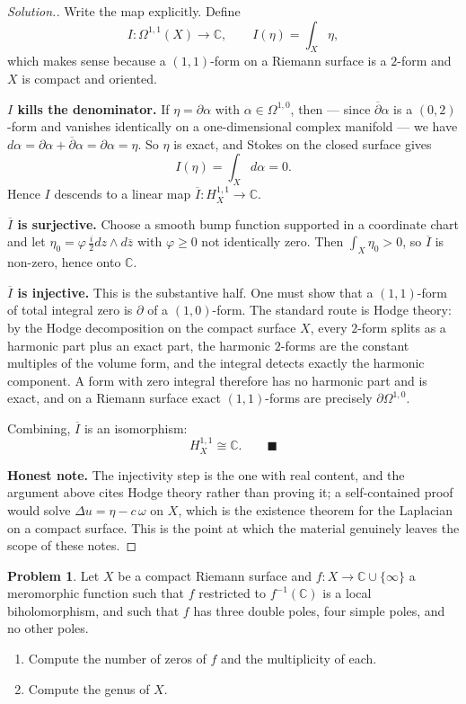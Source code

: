 \documentclass[11pt,a4paper]{article}
\theoremstyle{definition}
\newtheorem{problemx}{Problem}[section]
\newenvironment{problem}{\begin{problemx}}{\end{problemx}}
\newenvironment{solution}
  {\renewcommand{\qedsymbol}{}\begin{proof}[\textit{Solution}.]}
  {\end{proof}}
\begin{document}
\begin{solution}
Write the map explicitly. Define
$$I : \Omega^{1,1}(X) \longrightarrow \mathbb{C},
\qquad I(\eta) = \int_{X}\eta ,$$
which makes sense because a $(1,1)$-form on a Riemann surface is a $2$-form and $X$
is compact and oriented.

\textbf{$I$ kills the denominator.} If $\eta = \partial\alpha$ with
$\alpha \in \Omega^{1,0}$, then --- since $\overline{\partial}\alpha$ is a $(0,2)$-form
and vanishes identically on a one-dimensional complex manifold --- we have
$d\alpha = \partial\alpha + \overline{\partial}\alpha = \partial\alpha = \eta$. So
$\eta$ is exact, and Stokes on the closed surface gives
$$I(\eta) = \int_{X} d\alpha = 0 .$$
Hence $I$ descends to a linear map
$\overline{I} : H^{1,1}_{X} \rightarrow \mathbb{C}$.

\textbf{$\overline{I}$ is surjective.} Choose a smooth bump function supported in a
coordinate chart and let $\eta_0 = \varphi\,\tfrac{i}{2}dz\wedge d\overline{z}$
with $\varphi \geq 0$ not identically zero. Then $\int_X \eta_0 > 0$, so
$\overline{I}$ is non-zero, hence onto $\mathbb{C}$.

\textbf{$\overline{I}$ is injective.} This is the substantive half. One must show
that a $(1,1)$-form of total integral zero is $\partial$ of a $(1,0)$-form. The
standard route is Hodge theory: by the Hodge decomposition on the compact surface
$X$, every $2$-form splits as a harmonic part plus an exact part, the harmonic
$2$-forms are the constant multiples of the volume form, and the integral detects
exactly the harmonic component. A form with zero integral therefore has no harmonic
part and is exact, and on a Riemann surface exact $(1,1)$-forms are precisely
$\partial\Omega^{1,0}$.

Combining, $\overline{I}$ is an isomorphism:
$$\boxed{H^{1,1}_{X} \cong \mathbb{C} .} \qquad \blacksquare$$

\textbf{Honest note.} The injectivity step is the one with real content, and the
argument above cites Hodge theory rather than proving it; a self-contained proof
would solve $\Delta u = \eta - c\,\omega$ on $X$, which is the existence theorem
for the Laplacian on a compact surface. This is the point at which the material
genuinely leaves the scope of these notes.
\end{solution}


\begin{problem}
Let $X$ be a compact Riemann surface and $f : X \rightarrow \mathbb{C}\cup\{\infty\}$
a meromorphic function such that $f$ restricted to $f^{-1}(\mathbb{C})$ is a
local biholomorphism, and such that $f$ has three double poles, four simple
poles, and no other poles.
\begin{enumerate}
\item[(a).] Compute the number of zeros of $f$ and the multiplicity of each.
\item[(b).] Compute the genus of $X$.
\end{enumerate}
\end{problem}
\end{document}

